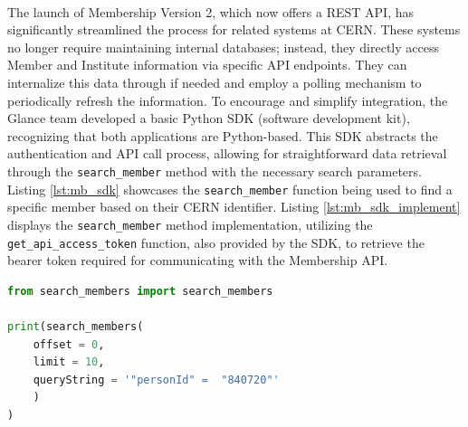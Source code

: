\paragraph{} The launch of Membership Version 2, which now offers a REST API, has significantly streamlined the process for related systems at CERN. These systems no longer require maintaining internal databases; instead, they directly access Member and Institute information via specific API endpoints. They can internalize this data through if needed and employ a polling mechanism to periodically refresh the information. To encourage and simplify integration, the Glance team developed a basic Python SDK (software development kit), recognizing that both applications are Python-based. This SDK abstracts the authentication and API call process, allowing for straightforward data retrieval through the \verb|search_member| method with the necessary search parameters. Listing \ref{lst:mb_sdk} showcases the \verb|search_member| function being used to find a specific member based on their CERN identifier. Listing \ref{lst:mb_sdk_implement} displays the \verb|search_member| method implementation, utilizing the \verb|get_api_access_token| function, also provided by the SDK, to retrieve the bearer token required for communicating with the Membership API.

\begin{lstlisting}[language=python, caption=Membership Python SDK usage., label=lst:mb_sdk]
from search_members import search_members

print(search_members(
    offset = 0,
    limit = 10,
    queryString = '"personId" =  "840720"'
    )
)

\end{lstlisting}

